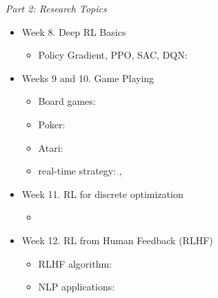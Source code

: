 \documentclass{article}
\begin{document}
{\it Part 2: Research Topics}
\begin{itemize}
    \item[] Week 8. Deep RL Basics
        \begin{itemize}
            \item Policy Gradient, PPO, SAC, DQN: \cite{achiam}
        \end{itemize}
        
    \item[] Weeks 9 and 10. Game Playing
    \begin{itemize}
        \item Board games: \cite{silver}
        \item Poker: \cite{brown}
        \item Atari: \cite{badia}
    \item real-time strategy: \cite{berner}, \cite{vinyals}
    \end{itemize}
    \item[] Week 11. RL for discrete optimization
        \begin{itemize}
            \item \cite{wagner, roy, fawzi}
        \end{itemize} 
    \item[] Week 12. RL from Human Feedback (RLHF)
        \begin{itemize}
            \item RLHF algorithm: \cite{christiano}
            \item NLP applications: \cite{stiennon, ouyang}
        \end{itemize}
        
\end{itemize}



\end{document}
